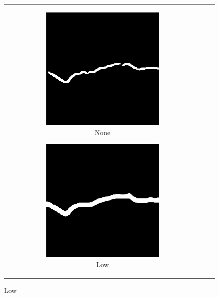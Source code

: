 \documentclass[a4paper,12pt]{report}
\begin{document}
\begin{figure}[htbp]
    \centering
    \begin{tabular}{ccc}
        \begin{subfigure}[b]{0.3\textwidth}
            \centering
            \includegraphics[width=0.75\textwidth]{res/class-balancing-comparison/sc-crackseg-none}
            \caption{None}
            \label{fig:crackseg-class-balancing-none}
        \end{subfigure}
        \begin{subfigure}[b]{0.3\textwidth}
            \centering
            \includegraphics[width=0.75\textwidth]{res/class-balancing-comparison/sc-crackseg-low}
            \caption{Low}
            \label{fig:crackseg-class-balancing-low}

\end{subfigure}
\end{tabular}
\end{figure}
\end{document}

